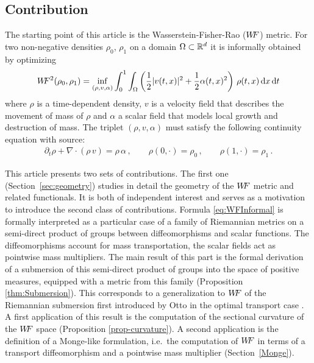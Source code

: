 \subsection{Contribution}
\label{sec:IntroContribution}
The starting point of this article is the Wasserstein-Fisher-Rao ($W\! \! F$) metric. For two non-negative densities $\rho_0$, $\rho_1$ on a domain $\Omega \subset \mathbb{R}^d$ it is informally obtained by optimizing
\begin{align}
	\label{eq:WFInformal}
	W\! \! F^2(\rho_0,\rho_1) = \inf_{(\rho,v,\alpha)} \int_0^1 \int_{\Omega} \left( \frac{1}{2} |v(t,x)|^2 + \frac{1}{2} \alpha(t,x)^2 \right)\,\rho(t,x)\,\mathrm{d} x\,\mathrm{d} t
\end{align}
where $\rho$ is a time-dependent density, $v$ is a velocity field that describes the movement of mass of $\rho$ and $\alpha$ a scalar field that models local growth and destruction of mass. The triplet $(\rho,v,\alpha)$ must satisfy the following continuity equation with source:
\begin{align}
	\label{eq:ContinuityEqInformal}
	\partial_t \rho + \nabla \cdot (\rho\,v) = \rho\,\alpha\,, \qquad
	\rho(0,\cdot) = \rho_0\,, \qquad
	\rho(1,\cdot) = \rho_1\,.
\end{align}

This article presents two sets of contributions. The first one (Section~\ref{sec:geometry}) studies in detail the geometry of the $W\! \! F$ metric and related functionals. It is both of independent interest and serves as a motivation to introduce the second class of contributions.
Formula \eqref{eq:WFInformal} is formally interpreted as a particular case of a family of Riemannian metrics on a semi-direct product of groups between diffeomorphisms and scalar functions. The diffeomorphisms account for mass transportation, the scalar fields act as pointwise mass multipliers.
%
The main result of this part is the formal derivation of a submersion of this semi-direct product of groups into the space of positive measures, equipped with a metric from this family (Proposition \ref{thm:Submersion}). This corresponds to a generalization to $W\! \! F$ of the Riemannian submersion first introduced by Otto in the optimal transport case \cite{OttoPorousMedium}. 
%
A first application of this result is the computation of the sectional curvature of the $W\! \! F$ space (Proposition \ref{prop-curvature}). A second application is the definition of a Monge-like formulation, i.e.\ the computation of $W\! \! F$ in terms of a transport diffeomorphism and a pointwise mass multiplier (Section~\ref{Monge}).


